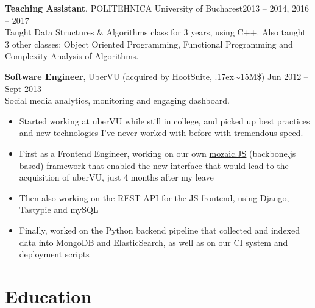 \documentclass[line, margin]{resume}
\newcommand{\bettertilde}{\raise.17ex\hbox{$\scriptstyle\mathtt{\sim}$}}
\begin{document}
\begin{resume}
\textbf{Teaching Assistant}, POLITEHNICA University of Bucharest\hfill 2013 -- 2014, 2016 -- 2017\\
Taught Data Structures \& Algorithms class for 3 years, using C++. Also taught 3 other classes: Object Oriented Programming, Functional Programming and Complexity Analysis of Algorithms.

\textbf{Software Engineer}, \href{http://ubervu.com}{UberVU} (acquired by HootSuite, \bettertilde15M\$) \hfill Jun 2012 -- Sept 2013\\
Social media analytics, monitoring and engaging dashboard.
\begin{itemize} \itemsep -2pt  %
	\item Started working at uberVU while still in college, and picked up best practices and new technologies I've never worked with before with tremendous speed.
	\item First as a Frontend Engineer, working on our own \href{https://github.com/uberVU/mozaic/}{mozaic.JS} (backbone.js based) framework that enabled the new interface that would lead to the acquisition of uberVU, just 4 months after my leave
    \item Then also working on the REST API for the JS frontend, using Django, Tastypie and mySQL
    \item Finally, worked on the Python backend pipeline that collected and indexed data into MongoDB and ElasticSearch, as well as on our CI system and deployment scripts
\end{itemize}



    \section{Education}



\end{resume}
\end{document}
